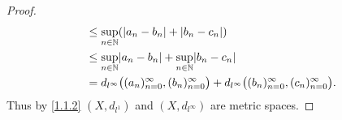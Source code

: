 \begin{proof}
\begin{align*}
                                                                     & \leq \sup_{n \in \N} (\abs{a_n - b_n} + \abs{b_n - c_n})                                                                               \\
                                                                     & \leq \sup_{n \in \N} \abs{a_n - b_n} + \sup_{n \in \N} \abs{b_n - c_n}                                                                 \\
                                                                     & = d_{l^\infty}\big((a_n)_{n = 0}^\infty, (b_n)_{n = 0}^\infty\big) + d_{l^\infty}\big((b_n)_{n = 0}^\infty, (c_n)_{n = 0}^\infty\big).
  \end{align*}
  Thus by \cref{1.1.2} \((X, d_{l^1})\) and \((X, d_{l^\infty})\) are metric spaces.


\end{proof}
